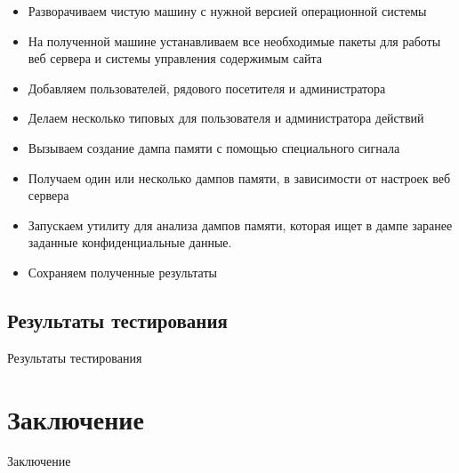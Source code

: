 \documentclass[20pt]{article}
\begin{document}
\begin{itemize}
  \item Разворачиваем чистую машину с нужной версией операционной системы
  \item На полученной машине устанавливаем все необходимые пакеты для работы
  веб сервера и системы управления содержимым сайта
  \item Добавляем пользователей, рядового посетителя и администратора
  \item Делаем несколько типовых для пользователя и администратора действий
  \item Вызываем создание дампа памяти с помощью специального сигнала
  \item Получаем один или несколько дампов памяти, в зависимости от настроек
  веб сервера
  \item Запускаем утилиту для анализа дампов памяти, которая ищет в дампе
  заранее заданные конфиденциальные данные.
  \item Сохраняем полученные результаты
\end{itemize}

\subsection{Результаты тестирования}
Результаты тестирования

\newpage

\section{Заключение}
Заключение



\end{document}
